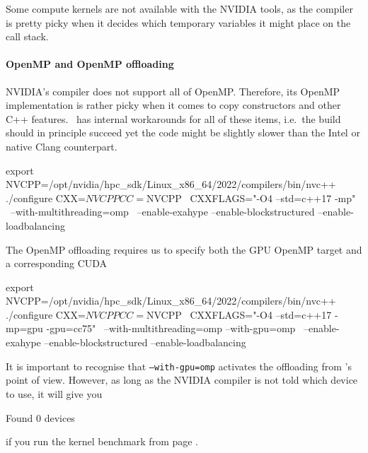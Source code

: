\noindent
Some compute kernels are not available with the NVIDIA tools, as the compiler is
pretty picky when it decides which temporary variables it might place on the
call stack.


\paragraph{OpenMP and OpenMP offloading}

NVIDIA's compiler does not support all of OpenMP. Therefore, its OpenMP
implementation is rather picky when it comes to copy constructors and other C++
features. \Peano\ has internal workarounds for all of these items, i.e.~the
build should in principle succeed yet the code might be slightly slower than the
Intel or native Clang counterpart.

\begin{bash}
export NVCPP=/opt/nvidia/hpc_sdk/Linux_x86_64/2022/compilers/bin/nvc++
./configure CXX=$NVCPP CC=$NVCPP \
 CXXFLAGS="-O4 --std=c++17 -mp" \
 --with-multithreading=omp \
 --enable-exahype --enable-blockstructured --enable-loadbalancing
\end{bash}

\noindent
The OpenMP offloading requires us to specify both the GPU OpenMP target and a
corresponding CUDA 


\begin{bash}
export NVCPP=/opt/nvidia/hpc_sdk/Linux_x86_64/2022/compilers/bin/nvc++
./configure CXX=$NVCPP CC=$NVCPP \
 CXXFLAGS="-O4 --std=c++17 -mp=gpu -gpu=cc75" \
 --with-multithreading=omp --with-gpu=omp \
 --enable-exahype --enable-blockstructured --enable-loadbalancing
\end{bash}




\noindent
It is important to recognise that \texttt{--with-gpu=omp} activates the
offloading from \Peano's point of view. 
However, as long as the NVIDIA compiler is not told which device to use, it will
give you

\begin{terminalOutput}
Found 0 devices
\end{terminalOutput}

\noindent
if you run the kernel benchmark from page \pageref{page:exahype:kernel-benchmark}.
% 
% 
% 
% 
% 



